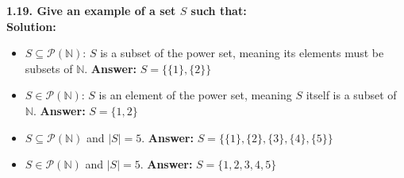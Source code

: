 \documentclass[12pt]{article}
\begin{document}
\vspace{0.5cm}
\textbf{1.19. Give an example of a set $S$ such that:} \\
\textbf{Solution:}
\begin{itemize}
    \item[(a)] $S \subseteq \mathcal{P}(\mathbb{N})$: $S$ is a subset of the power set, meaning its elements must be subsets of $\mathbb{N}$. \textbf{Answer:} $S = \{\{1\}, \{2\}\}$
    \item[(b)] $S \in \mathcal{P}(\mathbb{N})$: $S$ is an element of the power set, meaning $S$ itself is a subset of $\mathbb{N}$. \textbf{Answer:} $S = \{1, 2\}$
    \item[(c)] $S \subseteq \mathcal{P}(\mathbb{N})$ and $|S|=5$. \textbf{Answer:} $S = \{\{1\}, \{2\}, \{3\}, \{4\}, \{5\}\}$
    \item[(d)] $S \in \mathcal{P}(\mathbb{N})$ and $|S|=5$. \textbf{Answer:} $S = \{1, 2, 3, 4, 5\}$
\end{itemize}
\end{document}

